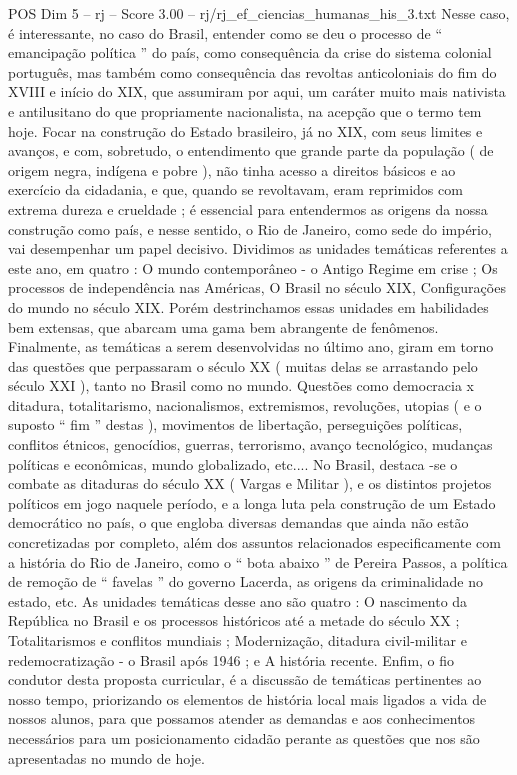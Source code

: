 \begin{textsample}{POS Dim 5 – rj – Score 3.00 – rj/rj\_ef\_ciencias\_humanas\_his\_3.txt}
Nesse caso, é interessante, no caso do Brasil, entender como se deu o processo de “ emancipação política ” do país, como consequência da crise do sistema colonial português, mas também como consequência das revoltas anticoloniais do fim do XVIII e início do XIX, que assumiram por aqui, um caráter muito mais nativista e antilusitano do que propriamente nacionalista, na acepção que o termo tem hoje.
Focar na construção do Estado brasileiro, já no XIX, com seus limites e avanços, e com, sobretudo, o entendimento que grande parte da população ( de origem negra, indígena e pobre ), não tinha acesso a direitos básicos e ao exercício da cidadania, e que, quando se revoltavam, eram reprimidos com extrema dureza e crueldade ; é essencial para entendermos as origens da nossa construção como país, e nesse sentido, o Rio de Janeiro, como sede do império, vai desempenhar um papel decisivo.
Dividimos as unidades temáticas referentes a este ano, em quatro : O mundo contemporâneo - o Antigo Regime em crise ; Os processos de independência nas Américas, O Brasil no século XIX, Configurações do mundo no século XIX.
Porém destrinchamos essas unidades em habilidades bem extensas, que abarcam uma gama bem abrangente de fenômenos.
Finalmente, as temáticas a serem desenvolvidas no último ano, giram em torno das questões que perpassaram o século XX ( muitas delas se arrastando pelo século XXI ), tanto no Brasil como no mundo.
Questões como democracia x ditadura, totalitarismo, nacionalismos, extremismos, revoluções, utopias ( e o suposto “ fim ” destas ), movimentos de libertação, perseguições políticas, conflitos étnicos, genocídios, guerras, terrorismo, avanço tecnológico, mudanças políticas e econômicas, mundo globalizado, etc....
No Brasil, destaca -se o combate as ditaduras do século XX ( Vargas e Militar ), e os distintos projetos políticos em jogo naquele período, e a longa luta pela construção de um Estado democrático no país, o que engloba diversas demandas que ainda não estão concretizadas por completo, além dos assuntos relacionados especificamente com a história do Rio de Janeiro, como o “ bota abaixo ” de Pereira Passos, a política de remoção de “ favelas ” do governo Lacerda, as origens da criminalidade no estado, etc.
As unidades temáticas desse ano são quatro : O nascimento da República no Brasil e os processos históricos até a metade do século XX ; Totalitarismos e conflitos mundiais ; Modernização, ditadura civil-militar e redemocratização - o Brasil após 1946 ; e A história recente.
Enfim, o fio condutor desta proposta curricular, é a discussão de temáticas pertinentes ao nosso tempo, priorizando os elementos de história local mais ligados a vida de nossos alunos, para que possamos atender as demandas e aos conhecimentos necessários para um posicionamento cidadão perante as questões que nos são apresentadas no mundo de hoje.

\end{textsample}
